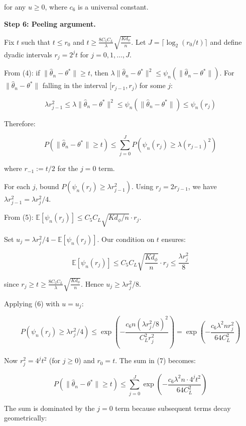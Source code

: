\documentclass[
  12pt,
]{article}
\begin{document}
for any \(u \geq 0\), where \(c_6\) is a universal constant.

\textbf{Step 6: Peeling argument.}

Fix \(t\) such that \(t \leq r_0\) and
\(t \geq \frac{8 C_5 C_L}{\lambda} \sqrt{\frac{K d_\phi}{n}}\). Let
\(J = \lceil \log_2(r_0/t) \rceil\) and define dyadic intervals
\(r_j = 2^j t\) for \(j = 0, 1, \dots, J\).

From (4): if \(\|\hat{\theta}_n - \theta^*\| \geq t\), then
\(\lambda \|\hat{\theta}_n - \theta^*\|^2 \leq \psi_n(\|\hat{\theta}_n - \theta^*\|)\).
For \(\|\hat{\theta}_n - \theta^*\|\) falling in the interval
\([r_{j-1}, r_j)\) for some \(j\):

\[\lambda r_{j-1}^2 \leq \lambda \|\hat{\theta}_n - \theta^*\|^2 \leq \psi_n(\|\hat{\theta}_n - \theta^*\|) \leq \psi_n(r_j)\]

Therefore:

\[P(\|\hat{\theta}_n - \theta^*\| \geq t) \leq \sum_{j=0}^J P\left(\psi_n(r_j) \geq \lambda (r_{j-1})^2\right) \tag{7}\]

where \(r_{-1} := t/2\) for the \(j=0\) term.

For each \(j\), bound \(P(\psi_n(r_j) \geq \lambda r_{j-1}^2)\). Using
\(r_j = 2r_{j-1}\), we have \(\lambda r_{j-1}^2 = \lambda r_j^2 / 4\).

From (5):
\(\mathbb{E}[\psi_n(r_j)] \leq C_5 C_L \sqrt{K d_\phi / n} \cdot r_j\).

Set \(u_j = \lambda r_j^2 / 4 - \mathbb{E}[\psi_n(r_j)]\). Our condition
on \(t\) ensures:

\[\mathbb{E}[\psi_n(r_j)] \leq C_5 C_L \sqrt{\frac{K d_\phi}{n}} \cdot r_j \leq \frac{\lambda r_j^2}{8}\]

since
\(r_j \geq t \geq \frac{8 C_5 C_L}{\lambda} \sqrt{\frac{K d_\phi}{n}}\).
Hence \(u_j \geq \lambda r_j^2 / 8\).

Applying (6) with \(u = u_j\):

\[P\left(\psi_n(r_j) \geq \lambda r_j^2 / 4\right) \leq \exp\left(-\frac{c_6 n (\lambda r_j^2 / 8)^2}{C_L^2 r_j^2}\right) = \exp\left(-\frac{c_6 \lambda^2 n r_j^2}{64 C_L^2}\right) \tag{8}\]

Now \(r_j^2 = 4^j t^2\) (for \(j \geq 0\)) and \(r_0 = t\). The sum in
(7) becomes:

\[P(\|\hat{\theta}_n - \theta^*\| \geq t) \leq \sum_{j=0}^J \exp\left(-\frac{c_6 \lambda^2 n \cdot 4^j t^2}{64 C_L^2}\right)\]

The sum is dominated by the \(j=0\) term because subsequent terms decay
geometrically:
\end{document}
